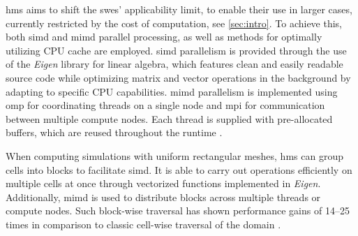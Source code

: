 
\gls{hms} aims to shift the \glspl{swe}' applicability limit, to enable their use in larger cases, currently restricted by the cost of computation, see \autoref{sec:intro}.
To achieve this, both \gls{simd} and \gls{mimd} parallel processing, as well as methods for optimally utilizing CPU cache are employed. 
\gls{simd} parallelism is provided through the use of the \emph{Eigen} library for linear algebra, which features clean and easily readable source code while optimizing matrix and vector operations in the background by adapting to specific CPU capabilities.
\gls{mimd} parallelism is implemented using \gls{omp} for coordinating threads on a single node and \gls{mpi} for communication between multiple compute nodes.
Each thread is supplied with pre-allocated buffers, which are reused throughout the runtime
\autocite{lennart-hms}.


When computing simulations with uniform rectangular meshes, \gls{hms} can group cells into blocks to facilitate \gls{simd}.
It is able to carry out operations efficiently on multiple cells at once through vectorized functions implemented in \emph{Eigen}.
Additionally, \gls{mimd} is used to distribute blocks across multiple threads or compute nodes.
Such block-wise traversal has shown performance gains of 14--25 times in comparison to classic cell-wise traversal of the domain \autocite{lennart-hms}.
